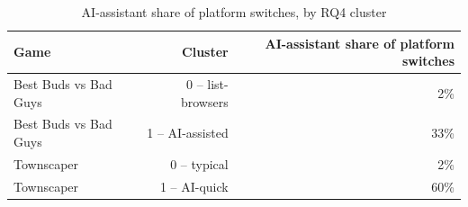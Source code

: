 \begin{table}[t]
\centering
\caption{AI-assistant share of platform switches, by RQ4 cluster}
\label{tab:rq7-ai-assistant-share}
\begin{tabular}{lrr}
\toprule
Game & Cluster & AI-assistant share of platform switches \\
\midrule
Best Buds vs Bad Guys & 0 -- list-browsers & 2\% \\
Best Buds vs Bad Guys & 1 -- AI-assisted & 33\% \\
Townscaper & 0 -- typical & 2\% \\
Townscaper & 1 -- AI-quick & 60\% \\
\bottomrule
\end{tabular}
\end{table}
